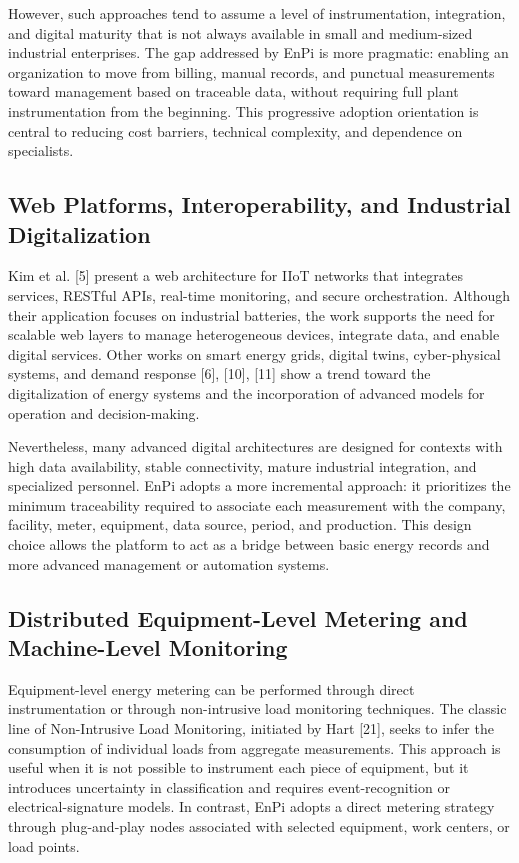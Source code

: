 \documentclass{ieeeaccess}
\begin{document}
However, such approaches tend to assume a level of instrumentation, integration, and digital maturity that is not always available in small and medium-sized industrial enterprises. The gap addressed by EnPi is more pragmatic: enabling an organization to move from billing, manual records, and punctual measurements toward management based on traceable data, without requiring full plant instrumentation from the beginning. This progressive adoption orientation is central to reducing cost barriers, technical complexity, and dependence on specialists.

\subsection{Web Platforms, Interoperability, and Industrial Digitalization}
\label{subsec:web-platforms}

Kim et al. [5] present a web architecture for IIoT networks that integrates services, RESTful APIs, real-time monitoring, and secure orchestration. Although their application focuses on industrial batteries, the work supports the need for scalable web layers to manage heterogeneous devices, integrate data, and enable digital services. Other works on smart energy grids, digital twins, cyber-physical systems, and demand response [6], [10], [11] show a trend toward the digitalization of energy systems and the incorporation of advanced models for operation and decision-making.

Nevertheless, many advanced digital architectures are designed for contexts with high data availability, stable connectivity, mature industrial integration, and specialized personnel. EnPi adopts a more incremental approach: it prioritizes the minimum traceability required to associate each measurement with the company, facility, meter, equipment, data source, period, and production. This design choice allows the platform to act as a bridge between basic energy records and more advanced management or automation systems.

\subsection{Distributed Equipment-Level Metering and Machine-Level Monitoring}
\label{subsec:machine-level-monitoring}

Equipment-level energy metering can be performed through direct instrumentation or through non-intrusive load monitoring techniques. The classic line of Non-Intrusive Load Monitoring, initiated by Hart [21], seeks to infer the consumption of individual loads from aggregate measurements. This approach is useful when it is not possible to instrument each piece of equipment, but it introduces uncertainty in classification and requires event-recognition or electrical-signature models. In contrast, EnPi adopts a direct metering strategy through plug-and-play nodes associated with selected equipment, work centers, or load points.
\end{document}
